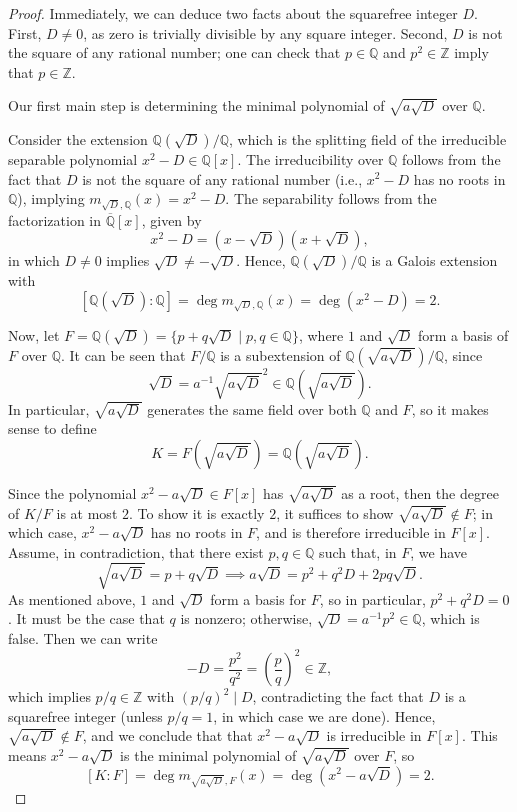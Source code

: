 \documentclass[12pt]{article}
\newcommand{\Z}{\mathbb{Z}}
\newcommand{\Q}{\mathbb{Q}}
\newcommand{\<}{\langle}
\renewcommand{\>}{\rangle}
\newcommand{\clo}{\overline}
\newcommand{\tsqrt}[1]{{\textstyle\sqrt{#1}}}
\newcommand{\pfrac}[2]{\left(\frac{#1}{#2}\right)}
\begin{document}
\begin{proof}
    Immediately, we can deduce two facts about the squarefree integer $D$. First, $D \ne 0$, as zero is trivially divisible by any square integer. Second, $D$ is not the square of any rational number; one can check that $p \in \Q$ and $p^2 \in \Z$ imply that $p \in \Z$.

    Our first main step is determining the minimal polynomial of $\sqrt{a\sqrt{D}}$ over $\Q$.

    Consider the extension $\Q(\sqrt{D})/\Q$, which is the splitting field of the irreducible separable polynomial $x^2 - D \in \Q[x]$. The irreducibility over $\Q$ follows from the fact that $D$ is not the square of any rational number (i.e., $x^2 - D$ has no roots in $\Q$), implying $m_{\sqrt{D}, \Q}(x) = x^2 - D$. The separability follows from the factorization in $\clo{\Q}[x]$, given by
    \[
        x^2 - D = (x - \sqrt{D})(x + \sqrt{D}),
    \]
    in which $D \ne 0$ implies $\sqrt{D} \ne -\sqrt{D}$. Hence, $\Q(\sqrt{D})/\Q$ is a Galois extension with
    \[
        [\Q(\sqrt{D}) : \Q] = \deg m_{\sqrt{D}, \Q}(x) = \deg(x^2 - D) = 2.
    \]

    Now, let $F = \Q(\sqrt{D}) = \{p + q\sqrt{D} \mid p, q \in \Q\}$, where $1$ and $\sqrt{D}$ form a basis of $F$ over $\Q$. It can be seen that $F/\Q$ is a subextension of $\Q(\sqrt{a\sqrt{D}})/\Q$, since
    \[
        \sqrt{D} = a^{-1}\tsqrt{a\sqrt{D}}^2 \in \Q(\tsqrt{a\sqrt{D}}).
    \]
    In particular, $\sqrt{a\sqrt{D}}$ generates the same field over both $\Q$ and $F$, so it makes sense to define
    \[
        K = F(\tsqrt{a\sqrt{D}}) = \Q(\tsqrt{a\sqrt{D}}).
    \]
    
    Since the polynomial $x^2 - a\sqrt{D} \in F[x]$ has $\sqrt{a\sqrt{D}}$ as a root, then the degree of $K/F$ is at most $2$. To show it is exactly $2$, it suffices to show $\sqrt{a\sqrt{D}} \notin F$; in which case, $x^2 - a\sqrt{D}$ has no roots in $F$, and is therefore irreducible in $F[x]$. Assume, in contradiction, that there exist $p, q \in \Q$ such that, in $F$, we have
    \[
        \tsqrt{a\sqrt{D}} = p + q\sqrt{D} \implies a\sqrt{D} = p^2 + q^2D + 2pq\sqrt{D}.
    \]
    As mentioned above, $1$ and $\sqrt{D}$ form a basis for $F$, so in particular, $p^2 + q^2D = 0$. It must be the case that $q$ is nonzero; otherwise, $\sqrt{D} = a^{-1}p^2 \in \Q$, which is false. Then we can write
    \[
        -D = \frac{p^2}{q^2} = \pfrac{p}{q}^2 \in \Z,
    \]
    which implies $p/q \in \Z$ with $(p/q)^2 \mid D$, contradicting the fact that $D$ is a squarefree integer (unless $p/q = 1$, in which case we are done). Hence, $\sqrt{a\sqrt{D}} \notin F$, and we conclude that that $x^2 - a\sqrt{D}$ is irreducible in $F[x]$. This means $x^2 - a\sqrt{D}$ is the minimal polynomial of $\sqrt{a\sqrt{D}}$ over $F$, so
    \[
        [K : F] = \deg m_{\sqrt{a\sqrt{D}}, F}(x) = \deg(x^2 - a\sqrt{D}) = 2.
    \]


\end{proof}
\end{document}
